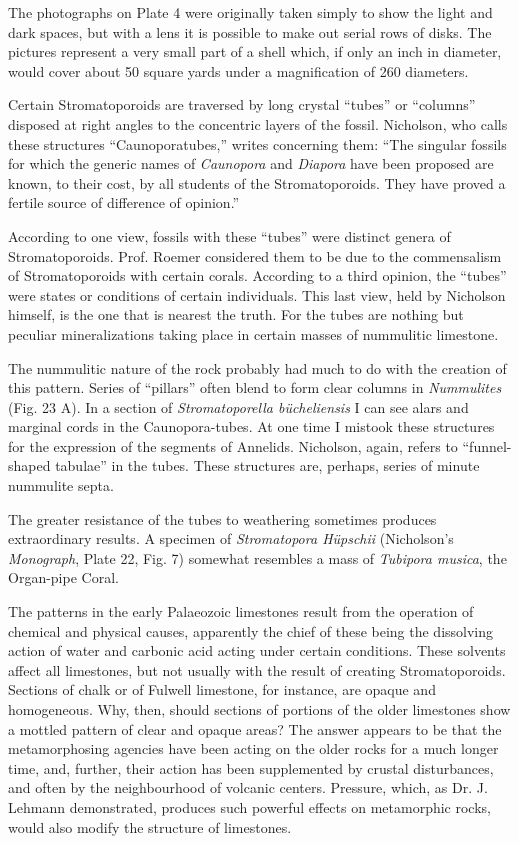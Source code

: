 \documentclass[a4paper, 12pt, oneside]{article}
\begin{document}
The photographs on Plate 4 were originally taken simply to show the light and dark spaces, but with a lens it is possible to make out serial rows of disks. The pictures represent a very small part of a shell which, if only an inch in diameter, would cover about 50 square yards under a magnification of 260 diameters.

Certain Stromatoporoids are traversed by long crystal ``tubes'' or ``columns'' disposed at right angles to the concentric layers of the fossil. Nicholson, who calls these structures ``Caunoporatubes,'' writes concerning them: ``The singular fossils for which the generic names of \emph{Caunopora} and \emph{Diapora} have been proposed are known, to their cost, by all students of the Stromatoporoids. They have proved a fertile source of difference of opinion.''

According to one view, fossils with these ``tubes'' were distinct genera of Stromatoporoids. Prof. Roemer considered them to be due to the commensalism of Stromatoporoids with certain corals. According to a third opinion, the ``tubes'' were states or conditions of certain individuals. This last view, held by Nicholson himself, is the one that is nearest the truth. For the tubes are nothing but peculiar mineralizations taking place in certain masses of nummulitic limestone.

The nummulitic nature of the rock probably had much to do with the creation of this pattern. Series of ``pillars'' often blend to form clear columns in \emph{Nummulites} (Fig. 23 A). In a section of \emph{Stromatoporella bücheliensis} I can see alars and marginal cords in the Caunopora-tubes. At one time I mistook these structures for the expression of the segments of Annelids. Nicholson, again, refers to ``funnel-shaped tabulae'' in the tubes. These structures are, perhaps, series of minute nummulite septa.

The greater resistance of the tubes to weathering sometimes produces extraordinary results. A specimen of \emph{Stromatopora Hüpschii} (Nicholson's \emph{Monograph}, Plate 22, Fig. 7) somewhat resembles a mass of \emph{Tubipora musica}, the Organ-pipe Coral.

The patterns in the early Palaeozoic limestones result from the operation of chemical and physical causes, apparently the chief of these being the dissolving action of water and carbonic acid acting under certain conditions. These solvents affect all limestones, but not usually with the result of creating Stromatoporoids. Sections of chalk or of Fulwell limestone, for instance, are opaque and homogeneous. Why, then, should sections of portions of the older limestones show a mottled pattern of clear and opaque areas? The answer appears to be that the metamorphosing agencies have been acting on the older rocks for a much longer time, and, further, their action has been supplemented by crustal disturbances, and often by the neighbourhood of volcanic centers. Pressure, which, as Dr. J. Lehmann demonstrated, produces such powerful effects on metamorphic rocks, would also modify the structure of limestones.
\end{document}
